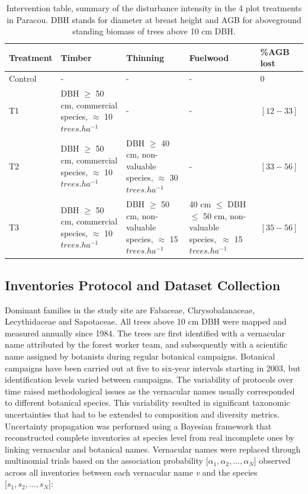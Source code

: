 \documentclass[fleqn,10pt]{ArtEcoFoG} %
\begin{document}
\begin{table}[t]

\caption{\label{tab:Tab1}Intervention table, summary of the disturbance intensity in the 4 plot treatments in Paracou. DBH stands for diameter at breast height and AGB for aboveground standing biomass of trees above 10 cm DBH.}
\centering
\begin{tabu} to 
\toprule
Treatment & Timber & Thinning & Fuelwood & \%AGB lost\\
\midrule
Control & - & - & - & 0\\
T1 & DBH $\geq$ 50 cm, commercial species, $\approx$ 10   $trees.ha^{-1}$ & - & - & $[12-33]$\\
T2 & DBH $\geq$ 50 cm, commercial species, $\approx$ 10  $trees.ha^{-1}$ & DBH $\geq$ 40 cm, non-valuable species, $\approx$ 30   $trees.ha^{-1}$ & - & $[33-56]$\\
T3 & DBH $\geq$ 50 cm, commercial species, $\approx$ 10  $trees.ha^{-1}$ & DBH $\geq$ 50 cm, non-valuable species, $\approx$ 15  $trees.ha^{-1}$ & 40 cm $\leq$ DBH $\leq$ 50 cm, non-valuable species,\ $\approx$ 15 $trees.ha^{-1}$ & $[35-56]$\\
\bottomrule
\end{tabu}
\end{table}\ignorespacesafterend

\hypertarget{inventories-protocol-and-dataset-collection}{%
\subsection{Inventories Protocol and Dataset Collection}\label{inventories-protocol-and-dataset-collection}}

Dominant families in the study site are Fabaceae, Chrysobalanaceae, Lecythidaceae and Sapotaceae. All trees above 10 cm DBH were mapped and measured annually since 1984. The trees are first identified with a vernacular name attributed by the forest worker team, and subsequently with a scientific name assigned by botanists during regular botanical campaigns.
Botanical campaigns have been carried out at five to six-year intervals starting in 2003, but identification levels varied between campaigns. The variability of protocols over time raised methodological issues as the vernacular names usually corresponded to different botanical species. This variability resulted in significant taxonomic uncertainties that had to be extended to composition and diversity metrics. Uncertainty propagation was performed using a Bayesian framework that reconstructed complete inventories at species level from real incomplete ones by linking vernacular and botanical names. Vernacular names were replaced through multinomial trials based on the association probability \(\big[\alpha_1, \alpha_2,..., \alpha_N\big]\) observed across all inventories between each vernacular name \emph{v} and the species \(\big[s_1, s_2,..., s_N\big]\):
\end{document}
